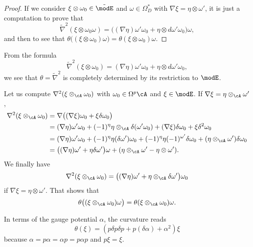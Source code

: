 \begin{proof}
If we consider $\xi\otimes\omega_0\in\tilde\modE$ and $\omega\in\Omega^*_D$ with $\nabla\xi=\eta\otimes\omega'$, it is just a computation to prove that
\[ 
  \tilde\nabla^2(\xi\otimes\omega_0\omega)=\big((\nabla\eta)\omega'\omega_0+\eta\otimes d\omega'\omega_0\big)\omega,
\]
and then to see that $\theta\big( (\xi\otimes\omega_0)\omega \big)=\theta(\xi\otimes\omega_0)\omega$.
\end{proof}

From the formula 
\begin{equation}
\tilde\nabla^2(\xi\otimes\omega_0)=(\nabla\eta)\omega'\omega_0+\eta\otimes d\omega'\omega_0,
\end{equation}
we see that $\theta=\tilde\nabla^2$ is completely determined by its restriction to $\modE$.

Let us compute $\nabla^2(\xi\otimes_{\cA}\omega_0)$ with $\omega_0\in\Omega^p\cA$ and $\xi\in\modE$. If $\nabla\xi=\eta\otimes_{\cA}\omega'$,
\begin{align*}
\nabla^2(\xi\otimes_{\cA}\omega_0)&=\nabla\big( (\nabla\xi)\omega_0+\xi\delta\omega_0 \big)\\
		& = (\nabla\eta)\omega'\omega_0+(-1)^{\eta}\eta\otimes_{\cA}\delta(\omega'\omega_0)+(\nabla\xi)\delta\omega_0+\xi\delta^{2}\omega_0\\
		& = (\nabla\eta)\omega'\omega_0+(-1)^{\eta}\eta(\delta\omega')\omega_0+(-1)^{\eta}\eta(-1)^{\omega'}\delta\omega_0+(\eta\otimes_{\cA}\omega')\delta\omega_0\\
		& = \big( (\nabla\eta)\omega'+\eta\delta\omega' \big)\omega+(\eta\otimes_{\cA}\omega'-\eta\otimes\omega').
\end{align*}
We finally have
\begin{equation}
\nabla^2(\xi\otimes_{\cA}\omega_0)=\big( (\nabla\eta)\omega'+\eta\otimes_{\cA}\delta\omega' \big)\omega_0
\end{equation}
if $\nabla\xi=\eta\otimes\omega'$. That shows that 
\begin{equation}	\label{EqThetaCourbomega}
\theta\big( (\xi\otimes_{\cA}\omega_0)\omega \big)=\theta(\xi\otimes_{\cA}\omega_0)\omega.
\end{equation}

In terms of the gauge potential $\alpha$, the curvature reads
\begin{equation}		\label{EqConnPotalpha}
 \theta(\xi)=(p\delta p\delta p+p(\delta\alpha)+\alpha^2)\xi
\end{equation}
because $\alpha=p\alpha=\alpha p=p\alpha p$ and $p\xi=\xi$.


